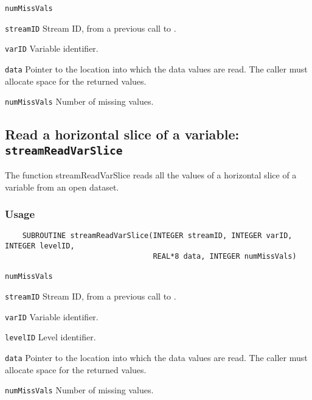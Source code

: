 \hspace*{4mm}\begin{minipage}[]{15cm}
\begin{deflist}{\texttt{numMissVals}\ }
\item[\texttt{streamID}]
Stream ID, from a previous call to {}.
\item[\texttt{varID}]
Variable identifier.
\item[\texttt{data}]
Pointer to the location into which the data values are read.
                     The caller must allocate space for the returned values.
\item[\texttt{numMissVals}]
Number of missing values.

\end{deflist}
\end{minipage}


\subsection{Read a horizontal slice of a variable: \texttt{streamReadVarSlice}}
\label{streamReadVarSlice}

The function streamReadVarSlice reads all the values of a horizontal slice of a variable
from an open dataset.
\subsubsection*{Usage}

\begin{verbatim}
    SUBROUTINE streamReadVarSlice(INTEGER streamID, INTEGER varID, INTEGER levelID, 
                                  REAL*8 data, INTEGER numMissVals)
\end{verbatim}

\hspace*{4mm}\begin{minipage}[]{15cm}
\begin{deflist}{\texttt{numMissVals}\ }
\item[\texttt{streamID}]
Stream ID, from a previous call to {}.
\item[\texttt{varID}]
Variable identifier.
\item[\texttt{levelID}]
Level identifier.
\item[\texttt{data}]
Pointer to the location into which the data values are read.
                     The caller must allocate space for the returned values.
\item[\texttt{numMissVals}]
Number of missing values.

\end{deflist}
\end{minipage}


